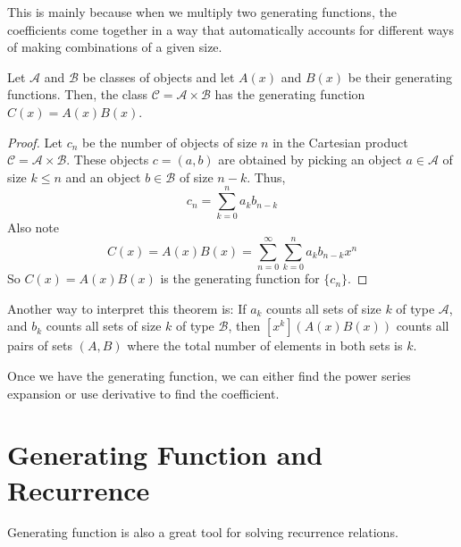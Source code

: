 This is mainly because when we multiply two generating functions, the coefficients come together in a way that automatically accounts for different ways of making combinations of a given size.

\begin{theorem}
    Let $\mathcal{A}$ and $\mathcal{B}$ be classes of objects and let $A(x)$ and $B(x)$ be their generating functions. Then, the class $\mathcal{C} = \mathcal{A} \times \mathcal{B}$ has the generating function $C(x) = A(x) B(x)$.
\end{theorem}

\begin{proof}
    Let $c_n$ be the number of objects of size $n$ in the Cartesian product $\mathcal{C} = \mathcal{A} \times \mathcal{B}$. These objects $c = (a,b)$ are obtained by picking an object $a \in \mathcal{A}$ of size $k \leq n$ and an object $b \in \mathcal{B}$ of size $n-k$. Thus,
    $$
    c_n = \sum_{k=0}^n a_k b_{n-k}
    $$
    Also note
    $$
    C(x) = A(x) B(x) = \sum_{n=0}^\infty \sum_{k=0}^n a_k b_{n-k} x^n
    $$
    So $C(x) = A(x)B(x)$ is the generating function for $\{c_n\}$.
\end{proof}

Another way to interpret this theorem is: If $a_k$ counts all sets of size $k$ of type $\mathcal{A}$, and $b_k$ counts all sets of size $k$ of type $\mathcal{B}$, then $[x^k](A(x)B(x))$ counts all pairs of sets $(A,B)$ where the total number of elements in both sets is $k$.

Once we have the generating function, we can either find the power series expansion or use derivative to find the coefficient.

\section{Generating Function and Recurrence}

Generating function is also a great tool for solving recurrence relations.

